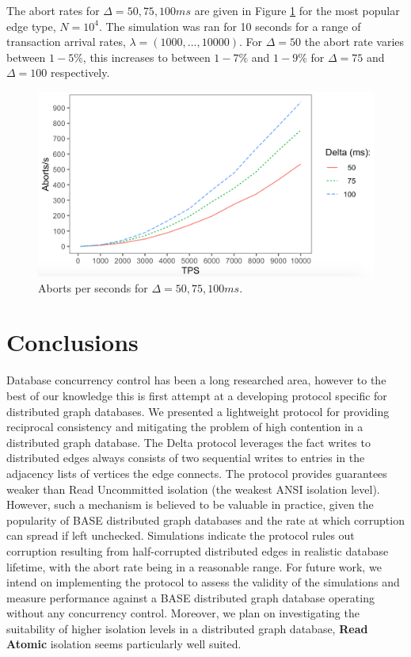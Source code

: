 \documentclass[sigplan,10pt]{acmart}
\newcommand{\tDelta}{\textsf{Delta}\xspace}
\begin{document}
The abort rates for $\Delta = 50, 75, 100ms$ are given in Figure \ref{aborts-results} for the most popular edge type, $N=10^4$. The simulation was ran for 10 seconds for a range of transaction arrival rates, $\lambda = (1000, ..., 10000)$. For $\Delta = 50$ the abort rate varies between $1-5\%$, this increases to between $1-7\%$ and $1-9\%$ for $\Delta = 75$ and $\Delta = 100$ respectively.

\begin{figure}[h]
  \centering
  \includegraphics[width=\linewidth]{./images/aborts_50_75_100}
  \caption{Aborts per seconds for $\Delta = 50, 75, 100ms$.}
  \label{aborts-results}
\end{figure}

\section{Conclusions}

Database concurrency control has been a long researched area, however to the best of our knowledge this is first attempt at a developing protocol specific for distributed graph databases. We presented a lightweight protocol for providing reciprocal consistency and mitigating the problem of high contention in a distributed graph database. The \tDelta protocol leverages the fact writes to distributed edges always consists of two sequential writes to entries in the adjacency lists of vertices the edge connects. The protocol provides guarantees weaker than Read Uncommitted isolation (the weakest ANSI isolation level). However, such a mechanism is believed to be valuable in practice, given the popularity of BASE distributed graph databases and the rate at which corruption can spread if left unchecked. Simulations indicate the protocol rules out corruption resulting from half-corrupted distributed edges in realistic database lifetime, with the abort rate being in a reasonable range. For future work, we intend on implementing the protocol to assess the validity of the simulations and measure performance against a BASE distributed graph database operating without any concurrency control. Moreover, we plan on investigating the suitability of higher isolation levels in a distributed graph database, \textbf{Read Atomic} isolation \cite{Bailis2014} seems particularly well suited.
\end{document}
